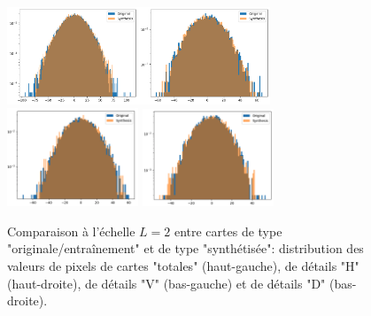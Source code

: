 \documentclass[12pt,twoside]{article}
\begin{document}
\begin{figure}
\centering
\includegraphics[width=0.35\textwidth]{fig-WL1-synt-L2-pixelval.png}\includegraphics[width=0.35\textwidth]{fig-WL1-synt-L2-details_1.png}\\
\includegraphics[width=0.35\textwidth]{fig-WL1-synt-L2-details_2.png}
\includegraphics[width=0.35\textwidth]{fig-WL1-synt-L2-details_3.png}
\caption{Comparaison à l'échelle $L=2$ entre cartes de type "originale/entraînement" et de type "synthétisée": distribution des valeurs de pixels de cartes "totales" (haut-gauche), de détails "H" (haut-droite), de détails "V" (bas-gauche) et de détails "D" (bas-droite). }
\label{fig-WL1-synt-L2}
\end{figure}
\end{document}
